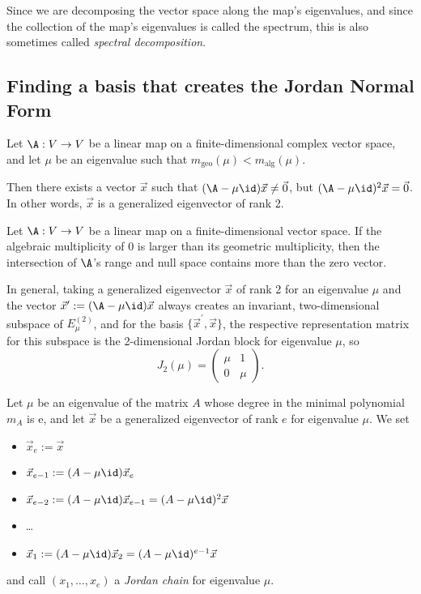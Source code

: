\begin{remark}
    Since we are decomposing the vector space along the map's eigenvalues, and
    since the collection of the map's eigenvalues is called the spectrum, this
    is also sometimes called \emph{spectral decomposition}.
\end{remark}

\subsection{Finding a basis that creates the Jordan Normal Form}
\begin{theorem}
    Let $\A: V \to V$ be a linear map on a finite-dimensional complex vector
    space, and let $\mu$ be an eigenvalue such that $m_\text{geo}(\mu) <
    m_\text{alg}(\mu)$.

    Then there exists a vector $\vec{x}$ such that $(\A-\mu \id)\vec{x} \ne
    \vec{0}$, but $(\A - \mu \id)^2\vec{x}=\vec{0}$. In other words, $\vec{x}$ is
    a generalized eigenvector of rank 2.
\end{theorem}

\begin{theorem}
    Let $\A:V \to V$ be a linear map on a finite-dimensional vector space. If
    the algebraic multiplicity of 0 is larger than its geometric multiplicity,
    then the intersection of $\A$'s range and null space contains more than the
    zero vector.
\end{theorem}

\begin{theorem}
    In general, taking a generalized eigenvector $\vec{x}$ of rank 2 for an
    eigenvalue $\mu$ and the vector $\vec{x}^\prime:=(\A - \mu \id)\vec{x}$
    always creates an invariant, two-dimensional subspace of $E_\mu^{(2)}$, and
    for the basis $\{\vec{x}^\prime, \vec{x}\}$, the respective representation
    matrix for this subspace is the 2-dimensional Jordan block for eigenvalue
    $\mu$, so $$J_2(\mu) = \begin{pmatrix}\mu & 1\\0&\mu\end{pmatrix}.$$
\end{theorem}

\begin{definition}
    Let $\mu$ be an eigenvalue of the matrix $A$ whose degree in the minimal
    polynomial $m_A$ is e, and let $\vec{x}$ be a generalized eigenvector of
    rank $e$ for eigenvalue $\mu$. We set
    \begin{itemize}
        \item $\vec{x}_e:=\vec{x}$
        \item $\vec{x}_{e-1}:= (A - \mu\id)\vec{x}_e$
        \item $\vec{x}_{e-2}:= (A - \mu\id)\vec{x}_{e-1} = (A - \mu\id)^2\vec{x}$
        \item \dots
        \item $\vec{x}_1 := (A-\mu\id)\vec{x}_2 = (A-\mu\id)^{e-1}\vec{x}$
    \end{itemize}
    and call $(x_1,\dots,x_e)$ a \emph{Jordan chain} for eigenvalue $\mu$.
\end{definition}

